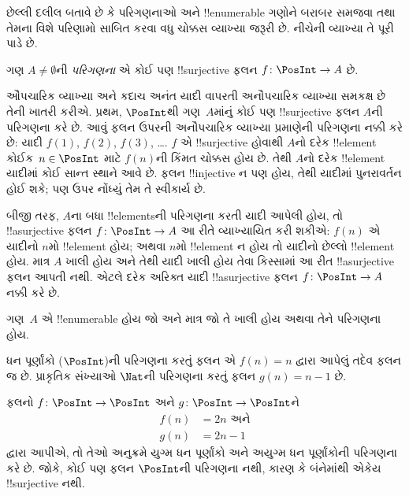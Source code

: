 \documentclass[../../../include/open-logic-section]{subfiles}
\begin{document}
છેલ્લી દલીલ બતાવે છે કે પરિગણનાઓ અને !!{enumerable}
ગણોને બરાબર સમજવા તથા તેમના વિશે પરિણામો સાબિત કરવા
વધુ ચોક્કસ વ્યાખ્યા જરૂરી છે. નીચેની વ્યાખ્યા તે પૂરી પાડે છે.

\begin{defn}
ગણ $A \neq \emptyset$ની \emph{પરિગણના} એ કોઈ પણ
!!{surjective} ફલન $f \colon \PosInt \to A$ છે.
\end{defn}

\begin{explain}
ઔપચારિક વ્યાખ્યા અને કદાચ અનંત યાદી વાપરતી અનૌપચારિક
વ્યાખ્યા સમકક્ષ છે તેની ખાતરી કરીએ. પ્રથમ,
$\PosInt$થી ગણ~$A$માંનું કોઈ પણ !!{surjective}
ફલન $A$ની પરિગણના કરે છે. આવું ફલન ઉપરની
અનૌપચારિક વ્યાખ્યા પ્રમાણેની પરિગણના નક્કી કરે છે:
યાદી $f(1)$, $f(2)$, $f(3)$, \dots.
$f$ એ !!{surjective} હોવાથી $A$નો દરેક !!{element}
કોઈક~$n \in \PosInt$ માટે $f(n)$ની કિંમત
ચોક્કસ હોય છે. તેથી $A$નો દરેક !!{element} યાદીમાં
કોઈ સાન્ત સ્થાને આવે છે. ફલન !!{injective}
ન પણ હોય, તેથી યાદીમાં પુનરાવર્તન હોઈ શકે;
પણ ઉપર નોંધ્યું તેમ તે સ્વીકાર્ય છે.

બીજી તરફ, $A$ના બધા !!{element}sની પરિગણના
કરતી યાદી આપેલી હોય, તો !!a{surjective} ફલન
$f\colon \PosInt \to A$ આ રીતે વ્યાખ્યાયિત કરી શકીએ:
$f(n)$ એ યાદીનો $n$મો !!{element} હોય; અથવા
$n$મો !!{element} ન હોય તો યાદીનો છેલ્લો
!!{element} હોય. માત્ર $A$ ખાલી હોય અને તેથી
યાદી ખાલી હોય તેવા કિસ્સામાં આ રીત !!a{surjective}
ફલન આપતી નથી. એટલે દરેક અરિક્ત યાદી
!!a{surjective} ફલન $f\colon \PosInt \to A$
નક્કી કરે છે.
\end{explain}

\begin{defn}
ગણ~$A$ એ !!{enumerable} હોય જો અને માત્ર જો
તે ખાલી હોય અથવા તેને પરિગણના હોય.
\end{defn}

\begin{ex}
ધન પૂર્ણાંકો ($\PosInt$)ની પરિગણના કરતું ફલન
એ $f(n) = n$ દ્વારા આપેલું તદેવ ફલન જ છે.
પ્રાકૃતિક સંખ્યાઓ $\Nat$ની પરિગણના કરતું ફલન
$g(n) = n - 1$ છે.
\end{ex}

\begin{ex}
ફલનો $f\colon \PosInt \to \PosInt$ અને
$g \colon \PosInt \to
\PosInt$ને
\begin{align*}
f(n) & = 2n \text{ અને}\\
g(n) & = 2n - 1
\end{align*}
દ્વારા આપીએ, તો તેઓ અનુક્રમે યુગ્મ ધન પૂર્ણાંકો અને
અયુગ્મ ધન પૂર્ણાંકોની પરિગણના કરે છે. જોકે, કોઈ પણ
ફલન $\PosInt$ની પરિગણના નથી, કારણ કે બંનેમાંથી
એકેય !!{surjective} નથી.
\end{ex}
\end{document}
